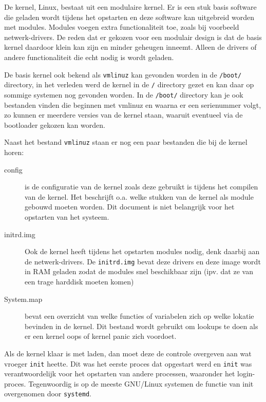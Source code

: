 De kernel, Linux, bestaat uit een modulaire kernel. Er is een stuk basis software die geladen wordt tijdens het opstarten en deze software kan uitgebreid worden met modules. Modules voegen extra functionaliteit toe, zoals bij voorbeeld netwerk-drivers. De reden dat er gekozen voor een modulair design is dat de basis kernel daardoor klein kan zijn en minder geheugen inneemt. Alleen de drivers of andere functionaliteit die echt nodig is wordt geladen.

De basis kernel ook bekend als \texttt{vmlinuz} kan gevonden worden in de \texttt{/boot/} directory, in het verleden werd de kernel in de \texttt{/} directory gezet en kan daar op sommige systemen nog gevonden worden. In de \texttt{/boot/} directory kan je ook bestanden vinden die beginnen met vmlinuz en waarna er een serienummer volgt, zo kunnen er meerdere versies van de kernel staan, waaruit eventueel via de bootloader gekozen kan worden.

Naast het bestand \texttt{vmlinuz} staan er nog een paar bestanden die bij de kernel horen:
\begin{description}
\item[config] is de configuratie van de kernel zoals deze gebruikt is tijdens het compilen van de kernel. Het beschrijft o.a. welke stukken van de kernel als module gebouwd moeten worden. Dit document is niet belangrijk voor het opstarten van het systeem.
\item[initrd.img] Ook de kernel heeft tijdens het opstarten modules nodig, denk daarbij aan de netwerk-drivers. De \texttt{initrd.img} bevat deze drivers en deze image wordt in RAM geladen zodat de modules snel beschikbaar zijn (ipv. dat ze van een trage harddisk moeten komen)
\item[System.map] bevat een overzicht van welke functies of variabelen zich op welke lokatie bevinden in de kernel. Dit bestand wordt gebruikt om lookups te doen als er een kernel oops of kernel panic zich voordoet.
\end{description}

Als de kernel klaar is met laden, dan moet deze de controle overgeven aan wat vroeger \texttt{init} heette. Dit was het eerste proces dat opgestart werd en \texttt{init} was verantwoordelijk voor het opstarten van andere processen, waaronder het login-proces. Tegenwoordig is op de meeste GNU/Linux systemen de functie van init overgenomen door \texttt{systemd}.

